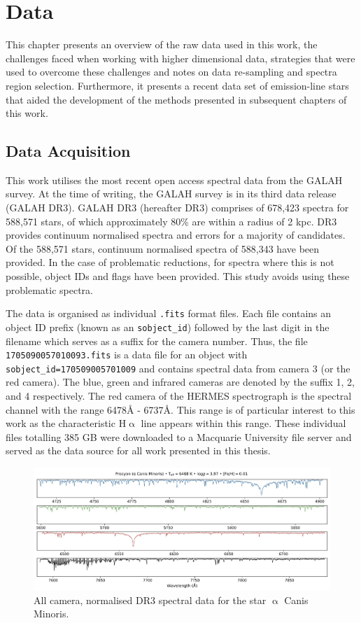 \chapter{Data}

This chapter presents an overview of the raw data used in this work, the challenges faced when working with higher dimensional data, strategies that were used to overcome these challenges and notes on data re-sampling and spectra region selection. Furthermore, it presents a recent data set of emission-line stars that aided the development of the methods presented in subsequent chapters of this work.

\section{Data Acquisition}

This work utilises the most recent open access spectral data from the GALAH survey. At the time of writing, the GALAH survey is in its third data release (GALAH DR3). GALAH DR3 (hereafter DR3) comprises of 678,423 spectra for 588,571 stars, of which approximately 80\% are within a radius of 2 kpc\cite{buder2021galah+}. DR3 provides continuum normalised spectra and errors for a majority of candidates. Of the 588,571 stars, continuum normalised spectra of 588,343 have been provided. In the case of problematic reductions, for spectra where this is not possible, object IDs and flags have been provided. This study avoids using these problematic spectra.

The data is organised as individual \texttt{.fits} format files. Each file contains an object ID prefix (known as an \texttt{sobject\_id}) followed by the last digit in the filename which serves as a suffix for the camera number. Thus, the file \texttt{1705090057010093.fits} is a data file for an object with \texttt{sobject\_id=170509005701009} and contains spectral data from camera 3 (or the red camera). The blue, green and infrared cameras are denoted by the suffix 1, 2, and 4 respectively.
The red camera of the HERMES spectrograph is the spectral channel with the range 6478\r{A} - 6737\r{A}\cite{sheinis2014first}. This range is of particular interest to this work as the characteristic H$\upalpha$ line appears within this range. These individual files totalling 385 GB were downloaded to a Macquarie University file server and served as the data source for all work presented in this thesis.

\begin{figure}[!htb]
\centering
\includegraphics[scale=.25]{figures/galah cameras.jpeg}
\caption{All camera, normalised DR3 spectral data for the star $\upalpha$ Canis Minoris.}
\end{figure}


